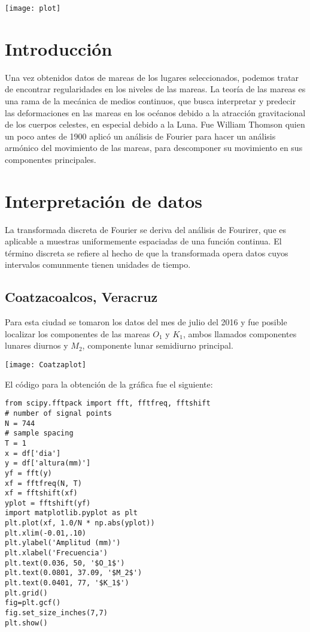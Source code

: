 \documentclass[12pt]{article}
\begin{document}
\begin{center}
	\texttt{[image: plot]}
	\end{center}
  
  \section{Introducción}
  
  Una vez obtenidos datos de mareas de los lugares seleccionados,  podemos tratar de encontrar regularidades en los niveles de las mareas.
La teoría de las mareas es una rama de la mecánica de medios continuos, que busca interpretar y predecir las deformaciones en las mareas en los océanos debido a la atracción gravitacional de los cuerpos celestes, en especial debido a la Luna.
Fue William Thomson quien un poco antes de 1900 aplicó un análisis de Fourier para hacer un análisis armónico del movimiento de las mareas, para descomponer su movimiento en sus componentes principales.


\newpage
\section{Interpretación de datos}
La transformada discreta de Fourier se deriva del análisis de Fourirer, que es aplicable a muestras uniformemente espaciadas de una función continua. El término discreta se refiere al hecho de que la transformada opera datos cuyos intervalos comunmente tienen unidades de tiempo.

\subsection{Coatzacoalcos, Veracruz}
Para esta ciudad se tomaron los datos del mes de julio del 2016 y fue posible localizar los componentes de las mareas $O_1$ y $K_1$, ambos llamados componentes lunares diurnos y $M_2$, componente lunar semidiurno principal.\\


	\begin{center}
	\texttt{[image: Coatzaplot]}
	\end{center}
    
El código para la obtención de la gráfica fue el siguiente:

\begin{verbatim}
from scipy.fftpack import fft, fftfreq, fftshift
# number of signal points
N = 744
# sample spacing
T = 1
x = df['dia']
y = df['altura(mm)']
yf = fft(y)
xf = fftfreq(N, T)
xf = fftshift(xf)
yplot = fftshift(yf)
import matplotlib.pyplot as plt
plt.plot(xf, 1.0/N * np.abs(yplot))
plt.xlim(-0.01,.10)
plt.ylabel('Amplitud (mm)')
plt.xlabel('Frecuencia')
plt.text(0.036, 50, '$O_1$')
plt.text(0.0801, 37.09, '$M_2$')
plt.text(0.0401, 77, '$K_1$')
plt.grid()
fig=plt.gcf()
fig.set_size_inches(7,7)
plt.show()
\end{verbatim}
\end{document}
